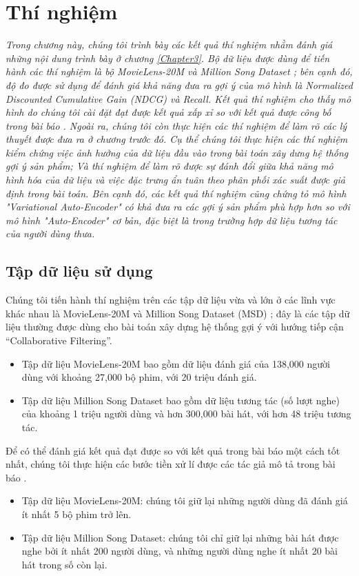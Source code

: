 \chapter{Thí nghiệm}
\justifying

\setlength{\parindent}{6.5ex}
\label{Chapter4}
\graphicspath{{Chapter4/Chapter4Figs}}
\textit{Trong chương này, chúng tôi trình bày các kết quả thí nghiệm nhằm đánh giá những nội dung trình bày ở chương \ref{Chapter3}. Bộ dữ liệu được dùng để tiến hành các thí nghiệm là bộ MovieLens-20M \cite{Ml20M} và Million Song Dataset \cite{MSD}; bên cạnh đó, độ đo được sử dụng để đánh giá khả năng đưa ra gợi ý của mô hình là Normalized Discounted Cumulative Gain (NDCG) và  Recall. Kết quả thí nghiệm cho thấy mô hình do chúng tôi cài đặt đạt được kết quả xấp xỉ so với kết quả được công bố trong bài báo \cite{mvae}. 
Ngoài ra, chúng tôi còn thực hiện các thí nghiệm để làm rõ các lý thuyết được đưa ra ở chương trước đó.
Cụ thể chúng tôi thực hiện các thí nghiệm kiểm chứng việc ảnh hưởng của dữ liệu đầu vào trong bài toán xây dưng hệ thống gợi ý sản phẩm;
Và thí nghiệm để làm rõ được sự đánh đổi giữa khả năng mô hình hóa của dữ liệu và việc đặc trưng ẩn tuân theo phân phối xác suất được giả định trong bài toán. 
Bên cạnh đó, các kết quả thí nghiệm cũng chứng tỏ mô hình "Variational Auto-Encoder" có khả đưa ra các gợi ý sản phẩm phù hợp hơn so với mô hình "Auto-Encoder" cơ bản, đặc biệt là trong trường hợp dữ liệu tương tác của người dùng thưa.
}


\section{Tập dữ liệu sử dụng}
\label{chap4sec1}
Chúng tôi tiến hành thí nghiệm trên các tập dữ liệu vừa và lớn ở các lĩnh vực khác nhau là MovieLens-20M \cite{Ml20M} 
và Million Song Dataset (MSD) \cite{MSD}; đây là các tập dữ liệu thường được dùng cho bài toán xây dựng hệ thống gợi ý
với hướng tiếp cận ``Collaborative Filtering''. 
\begin{itemize}
    \item Tập dữ liệu MovieLens-20M bao gồm dữ liệu đánh giá của 138,000 người dùng với khoảng 27,000 bộ phim,
    với 20 triệu đánh giá.
    \item Tập dữ liệu Million Song Dataset bao gồm dữ liệu tương tác (số lượt nghe) của khoảng 1 triệu người dùng và hơn 300,000 bài hát, với hơn 48 triệu tương tác.
\end{itemize}

Để có thể đánh giá kết quả đạt được so với kết quả trong bài báo \cite{mvae} một cách tốt nhất,
chúng tôi thực hiện các bước tiền xử lí được các tác giả mô tả trong bài báo \cite{mvae}.
\begin{itemize}
    \item Tập dữ liệu MovieLens-20M: chúng tôi giữ lại những người dùng đã đánh giá ít nhất 5 bộ phim trở lên. 
    \item Tập dữ liệu Million Song Dataset: chúng tôi chỉ giữ lại những bài hát được nghe bởi ít nhất 200 người dùng, và những người dùng nghe ít nhất 20 bài hát trong số còn lại.
\end{itemize}

